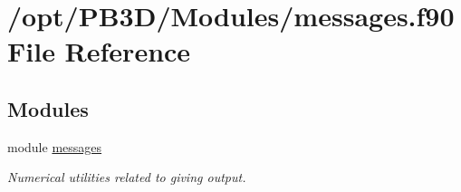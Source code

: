 \hypertarget{messages_8f90}{}\section{/opt/\+P\+B3\+D/\+Modules/messages.f90 File Reference}
\label{messages_8f90}
\subsection*{Modules}
\begin{DoxyCompactItemize}
\item 
module \hyperlink{namespacemessages}{messages}
\begin{DoxyCompactList}\small\item\em Numerical utilities related to giving output. \end{DoxyCompactList}\end{DoxyCompactItemize}
